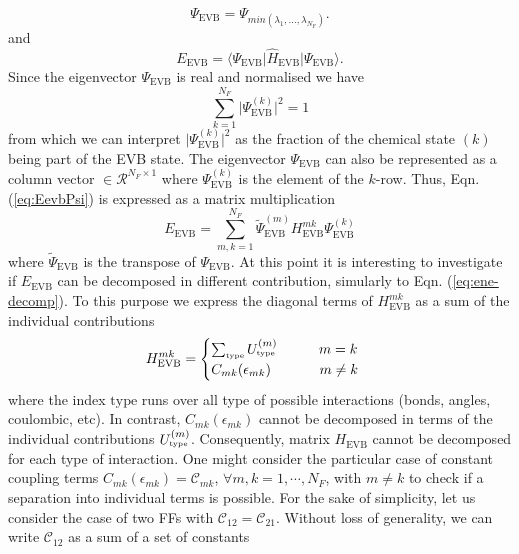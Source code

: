 \begin{equation}\label{eq:Psi-evb-norm}
 \Psi_{\text{EVB}}=\Psi_{min(\lambda_1,...,\lambda_{N_F})}.
\end{equation}
and
\begin{equation}\label{eq:EevbPsi}
 E_{\text{EVB}}=\big\langle \Psi_{\text{EVB}}\big|\hat{H}_{\text{EVB}}\big| \Psi_{\text{EVB}}\big \rangle.
\end{equation}
Since the eigenvector $\Psi_{\text{EVB}}$ is real and normalised we have
\begin{equation}\label{eq:evbPsinorm}
\sum_{k=1}^{N_F} \big|\Psi^{(k)}_{\text{EVB}}\big|^{2}=1
\end{equation}
from which we can interpret $|\Psi^{(k)}_{\text{EVB}}\big|^{2}$ as the fraction of the chemical state $(k)$ being part of the EVB state. The eigenvector $\Psi_{\text{EVB}}$ can also be represented as a column vector $\in \mathcal{R}^{N_F \times 1}$ where  $\Psi^{(k)}_{\text{EVB}}$ is the element of the $k$-row. Thus, Eqn. (\ref{eq:EevbPsi}) is expressed as a matrix multiplication
\begin{equation}\label{eq:EevbPsimat}
E_{\text{EVB}}=\sum_{m,k=1}^{N_F} \tilde{\Psi}^{(m)}_{\text{EVB}} H^{mk}_{\text{EVB}}\Psi^{(k)}_{\text{EVB}}
\end{equation}
where $\tilde{\Psi}_{\text{EVB}}$ is the transpose of ${\Psi}_{\text{EVB}}$. At this point it is interesting to investigate if $E_{\text{EVB}}$ can be decomposed in different contribution, simularly to Eqn. (\ref{eq:ene-decomp}). To this purpose we express the diagonal terms of $H^{mk}_{\text{EVB}}$ as a sum of the individual contributions 
\begin{equation}\label{eq:evbmatrix-dec}
H^{mk}_{\text{EVB}}=\begin{cases} \sum_{\text{\tiny{type}}} U_{\text{\tiny{type}}}^{(m)}              \,\,\,\,\,\,\,\,\,\,\,\,\,\,\,\,\,\,  m=k   \\
                                                                     C_{mk}(\epsilon_{mk})                     \,\,\,\,\,\,\,\,\,\,\,\,\,\,\,\,\,\,\,\,\,   m \ne k 
                                              \end{cases}
\end{equation}
where the index $\text{type}$ runs over all type of possible interactions (bonds, angles, coulombic, etc). In contrast, $C_{mk}(\epsilon_{mk})$ cannot be decomposed in terms of the individual contributions $U_{\text{\tiny{type}}}^{(m)}$. Consequently, matrix  $H_{\text{EVB}}$ cannot be decomposed for each type of interaction. One might consider the particular case of constant coupling terms $C_{mk}(\epsilon_{mk})=\mathcal{C}_{mk}$, $\forall m,k=1,\cdots, N_F$, with $m\ne k$ to check if a separation into individual terms is possible. For the sake of simplicity, let us consider the case of two FFs with $\mathcal{C}_{12}=\mathcal{C}_{21}$. Without loss of generality, we can write $\mathcal{C}_{12}$ as a sum of a set of constants 
